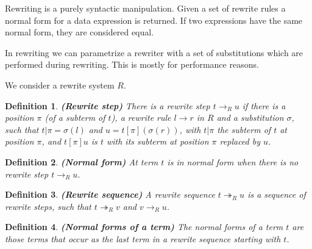 \documentclass[a4paper,11pt]{article}
\newtheorem{thdefinition}{Definition}[section]
\newenvironment{definition}
  {\begin{thdefinition}\em}
  {\end{thdefinition}}
\begin{document}
Rewriting is a purely syntactic manipulation. Given a set of rewrite rules a normal form for a data expression is returned. If two expressions have the same normal form, they are considered equal.

In rewriting we can parametrize a rewriter with a set of substitutions which are performed during rewriting. This is mostly for performance reasons.

We consider a rewrite system $R$.
\begin{definition}\textbf{(Rewrite step)}
There is a rewrite step $t \rightarrow_R u$ if there is a position $\pi$ (of a subterm of $t$), a rewrite rule $l \rightarrow r$ in $R$ and a substitution $\sigma$, such that $t|\pi = \sigma(l)$ and $u = t[\pi](\sigma(r))$, with $t|\pi$ the subterm of $t$ at position $\pi$, and $t[\pi]u$ is $t$ with its subterm at position $\pi$ replaced by $u$.
\end{definition}

\begin{definition}\textbf{(Normal form)}
At term $t$ is in normal form when there is no rewrite step $t \rightarrow_R u$.
\end{definition}

\begin{definition} \textbf{(Rewrite sequence)}
A rewrite sequence $t \twoheadrightarrow_R u$ is a sequence of rewrite steps, such that $t \twoheadrightarrow_R v$ and $v \rightarrow_R u$.
\end{definition}

\begin{definition}\textbf{(Normal forms of a term)}
The normal forms of a term $t$ are those terms that occur as the last term in a rewrite sequence starting with $t$.
\end{definition}

\end{document}
